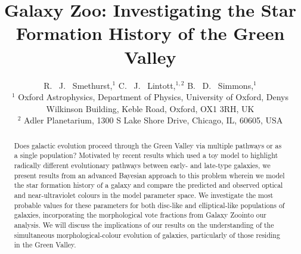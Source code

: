 \documentclass{mn2e}
\begin{document}
\title[The Star Fomation History of the Green Valley]{Galaxy Zoo: Investigating the Star Formation History of the Green Valley}
\author[Smethurst et al. 2014]{R. ~J. ~Smethurst,$^1$ C. ~J. ~Lintott,$^{1,2}$ B. ~D. ~Simmons,$^{1}$ \\ $^1$ Oxford Astrophysics, Department of Physics, University of Oxford, Denys Wilkinson Building, Keble Road, Oxford, OX1 3RH, UK \\ $^2$ Adler Planetarium, 1300 S Lake Shore Drive, Chicago, IL, 60605, USA }

\maketitle

\begin{abstract}
Does galactic evolution proceed through the Green Valley via multiple pathways or as a single population? Motivated by recent results which used a toy model to highlight radically different evolutionary pathways between early- and late-type galaxies, we present results from an advanced Bayesian approach to this problem wherein we model the star formation history of a galaxy and compare the predicted and observed optical and near-ultraviolet colours in the model parameter space. We investigate the most probable values for these parameters for both disc-like and elliptical-like populations of galaxies, incorporating the morphological vote fractions from Galaxy Zoo\footnotemark[1] into our analysis. We will discuss the implications of our results on the understanding of the simultaneous morphological-colour evolution of galaxies, particularly of those residing in the Green Valley. 
\end{abstract}

\\
\end{document}
